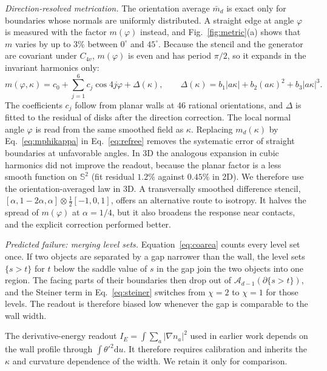 \documentclass[11pt,a4paper]{article}
\newcommand{\dd}{\mathrm{d}}
\newcommand{\Sn}{\mathbb S}
\begin{document}
\emph{Direction-resolved metrication.} The orientation average $\bar m_d$ is exact only for boundaries whose normals are uniformly distributed. A straight edge at angle $\varphi$ is measured with the factor $m(\varphi)$ instead, and Fig.~\ref{fig:metric}(a) shows that $m$ varies by up to 3\% between $0^\circ$ and $45^\circ$. Because the stencil and the generator are covariant under $C_{4v}$, $m(\varphi)$ is even and has period $\pi/2$, so it expands in the invariant harmonics only:
\begin{equation}
 m(\varphi,\kappa)=c_0+\sum_{j=1}^{6}c_j\cos4j\varphi+\Delta(\kappa),\qquad \Delta(\kappa)=b_1|a\kappa|+b_2(a\kappa)^2+b_3|a\kappa|^3 .
 \label{eq:mphikappa}
\end{equation}
The coefficients $c_j$ follow from planar walls at 46 rational orientations, and $\Delta$ is fitted to the residual of disks after the direction correction. The local normal angle $\varphi$ is read from the same smoothed field as $\kappa$. Replacing $m_d(\kappa)$ by Eq.~\eqref{eq:mphikappa} in Eq.~\eqref{eq:refree} removes the systematic error of straight boundaries at unfavorable angles. In 3D the analogous expansion in cubic harmonics did not improve the readout, because the planar factor is a less smooth function on $\Sn^2$ (fit residual $1.2\%$ against $0.45\%$ in 2D). We therefore use the orientation-averaged law in 3D. A transversally smoothed difference stencil, $[\alpha,1-2\alpha,\alpha]\otimes\tfrac12[-1,0,1]$, offers an alternative route to isotropy. It halves the spread of $m(\varphi)$ at $\alpha=1/4$, but it also broadens the response near contacts, and the explicit correction performed better.

\emph{Predicted failure: merging level sets.} Equation~\eqref{eq:coarea} counts every level set once. If two objects are separated by a gap narrower than the wall, the level sets $\{s>t\}$ for $t$ below the saddle value of $s$ in the gap join the two objects into one region. The facing parts of their boundaries then drop out of $\mathcal A_{d-1}(\partial\{s>t\})$, and the Steiner term in Eq.~\eqref{eq:steiner} switches from $\chi=2$ to $\chi=1$ for those levels. The readout is therefore biased low whenever the gap is comparable to the wall width.

The derivative-energy readout $I_E=\int\sum_a|\nabla n_a|^2$ used in earlier work depends on the wall profile through $\int\theta'^2\dd u$. It therefore requires calibration and inherits the $\kappa$ and curvature dependence of the width. We retain it only for comparison.
\end{document}

